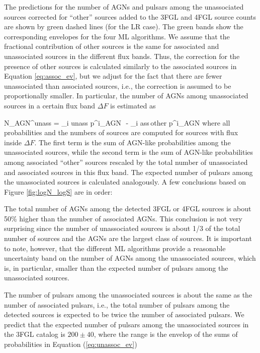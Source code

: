 The predictions for the number of AGNs and pulsars among the unassociated sources corrected for ``other'' sources 
added to the 3FGL and 4FGL source counts are shown by green dashed lines (for the LR case).
The green bands show the corresponding envelopes for the four ML algorithms.
We assume that the fractional contribution of other sources is the same for associated and unassociated sources in the different flux bands.
Thus, the correction for the presence of other sources is calculated similarly to the associated sources in Equation \ref{eq:assoc_ev},
but we adjust for the fact that there are fewer unassociated than associated sources, i.e., 
the correction is assumed to be proportionally smaller.
In particular, the number of AGNs among unassociated sources in a certain flux band $\Delta F$ is estimated as

\be
{}
N_{\rm AGN}^{\rm unass} = \sum_{i \in \rm unass} p^i_{\rm AGN}\,\, - \sum_{i \in \rm ass\,other} p^i_{\rm AGN} \cdot 
{}
\ee
where all probabilities and the numbers of sources are computed for sources with flux inside $\Delta F$.
The first term is the sum of AGN-like probabilities among the unassociated sources,
while the second term is the sum of AGN-like probabilities among associated ``other'' sources rescaled by the total number
of unassociated and associated sources in this flux band.
The expected number of pulsars among the unassociated sources is calculated analogously.
A few conclusions based on Figure \ref{fig:logN_logS} are in order:
\ben
\item
The total number of AGNs among the detected 3FGL or 4FGL sources is about 50\% higher than the number of associated AGNs.
This conclusion is not very surprising since the number of unassociated sources is about 1/3 of the total number of sources and the 
AGNs are the largest class of sources. It is important to note, however, that the different ML algorithms provide a reasonable uncertainty band on the number of AGNs among the unassociated sources, which is, in particular, smaller than the expected number of pulsars among the unassociated sources.
\item
The number of pulsars among the unassociated sources is about the same as the number of associated pulsars, i.e., the total number of pulsars among the detected sources is expected to be twice the number of associated pulsars.
\een
We predict that the expected number of pulsars among the unassociated sources in the 3FGL catalog
is $200 \pm 40$, where the range is the envelop of the sums of probabilities in Equation (\ref{eq:unassoc_ev})
